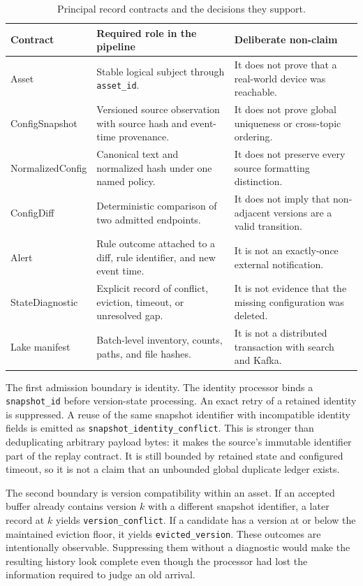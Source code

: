 \documentclass[a4paper,11pt]{article}
\begin{document}
\begin{table}[ht]
\centering
\caption{Principal record contracts and the decisions they support.}
\label{tab:contract-roles}
\small
\begin{tabularx}{\textwidth}{p{}X X}
\toprule
Contract & Required role in the pipeline & Deliberate non-claim \\
\midrule
Asset & Stable logical subject through \texttt{asset\_id}. & It does not prove that a real-world device was reachable. \\
ConfigSnapshot & Versioned source observation with source hash and event-time provenance. & It does not prove global uniqueness or cross-topic ordering. \\
NormalizedConfig & Canonical text and normalized hash under one named policy. & It does not preserve every source formatting distinction. \\
ConfigDiff & Deterministic comparison of two admitted endpoints. & It does not imply that non-adjacent versions are a valid transition. \\
Alert & Rule outcome attached to a diff, rule identifier, and new event time. & It is not an exactly-once external notification. \\
StateDiagnostic & Explicit record of conflict, eviction, timeout, or unresolved gap. & It is not evidence that the missing configuration was deleted. \\
Lake manifest & Batch-level inventory, counts, paths, and file hashes. & It is not a distributed transaction with search and Kafka. \\
\bottomrule
\end{tabularx}
\end{table}

The first admission boundary is identity. The identity processor binds a \texttt{snapshot\_id} before version-state processing. An exact retry of a retained identity is suppressed. A reuse of the same snapshot identifier with incompatible identity fields is emitted as \texttt{snapshot\_identity\_conflict}. This is stronger than deduplicating arbitrary payload bytes: it makes the source's immutable identifier part of the replay contract. It is still bounded by retained state and configured timeout, so it is not a claim that an unbounded global duplicate ledger exists.

The second boundary is version compatibility within an asset. If an accepted buffer already contains version $k$ with a different snapshot identifier, a later record at $k$ yields \texttt{version\_conflict}. If a candidate has a version at or below the maintained eviction floor, it yields \texttt{evicted\_version}. These outcomes are intentionally observable. Suppressing them without a diagnostic would make the resulting history look complete even though the processor had lost the information required to judge an old arrival.
\end{document}
